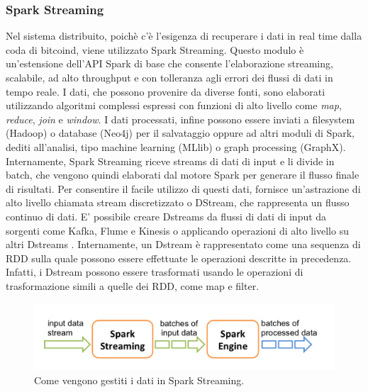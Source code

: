 \subsubsection{Spark Streaming}
\label{sub:spark streaming}
Nel sistema distribuito, poichè c'è l'esigenza di recuperare i dati in real time dalla coda di bitcoind, viene utilizzato Spark Streaming. Questo modulo è un'estensione dell'API Spark di base che consente l'elaborazione streaming, scalabile, ad alto throughput e con tolleranza agli errori dei flussi di dati in tempo reale. I dati, che possono provenire da diverse fonti, sono elaborati utilizzando algoritmi complessi espressi con funzioni di alto livello come \textit{map}, \textit{reduce}, \textit{join} e \textit{window}. I dati processati, infine possono essere inviati a filesystem (Hadoop) o database (Neo4j) per il salvataggio oppure ad altri moduli di Spark, dediti all'analisi, tipo machine learning (MLlib) o graph processing (GraphX). 
\\Internamente, Spark Streaming riceve streams di dati di input e li divide in batch, che vengono quindi elaborati dal motore Spark per generare il flusso finale di risultati. Per consentire il facile utilizzo di questi dati, fornisce un'astrazione di alto livello chiamata stream discretizzato o DStream, che rappresenta un flusso continuo di dati. E' possibile creare Dstreams da flussi di dati di input da sorgenti come Kafka, Flume e Kinesis o applicando operazioni di alto livello su altri Dstreams \cite{spark:home-streaming}. Internamente, un Dstream è rappresentato come una sequenza di RDD sulla quale possono essere effettuate le operazioni descritte in precedenza. Infatti, i Dstream possono essere trasformati usando le operazioni di trasformazione simili a quelle dei RDD, come map e filter.
\begin{figure}[H]
	\centering
	\includegraphics[width=\textwidth]{images/streamingSpark.png}
	\caption{Come vengono gestiti i dati in Spark Streaming.}
	\label{fig:streamingSpark}
\end{figure}
